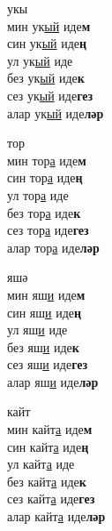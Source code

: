 \begin{multicols}{4}
\begin{enumerate}
\begin{minipage}{\linewidth}
    \item
    укы\\
    мин ук\underline{ый} иде\textbf{м}\\
    син ук\underline{ый} иде\textbf{ң}\\
    ул ук\underline{ый} иде\\
    без ук\underline{ый} иде\textbf{к}\\
    сез ук\underline{ый} иде\textbf{гез}\\
    алар ук\underline{ый} иде\textbf{ләр}\\
\end{minipage}

\begin{minipage}{\linewidth}
    \item
    тор\\
    мин тор\underline{а} иде\textbf{м}\\
    син тор\underline{а} иде\textbf{ң}\\
    ул тор\underline{а} иде\\
    без тор\underline{а} иде\textbf{к}\\
    сез тор\underline{а} иде\textbf{гез}\\
    алар тор\underline{а} иде\textbf{ләр}\\
\end{minipage}

\begin{minipage}{\linewidth}
    \item
    яшә\\
    мин яш\underline{и} иде\textbf{м}\\
    син яш\underline{и} иде\textbf{ң}\\
    ул яш\underline{и} иде\\
    без яш\underline{и} иде\textbf{к}\\
    сез яш\underline{и} иде\textbf{гез}\\
    алар яш\underline{и} иде\textbf{ләр}\\
\end{minipage}

\begin{minipage}{\linewidth}
    \item
    кайт\\
    мин кайт\underline{а} иде\textbf{м}\\
    син кайт\underline{а} иде\textbf{ң}\\
    ул кайт\underline{а} иде\\
    без кайт\underline{а} иде\textbf{к}\\
    сез кайт\underline{а} иде\textbf{гез}\\
    алар кайт\underline{а} иде\textbf{ләр}\\
\end{minipage}


\end{enumerate}
\end{multicols}
